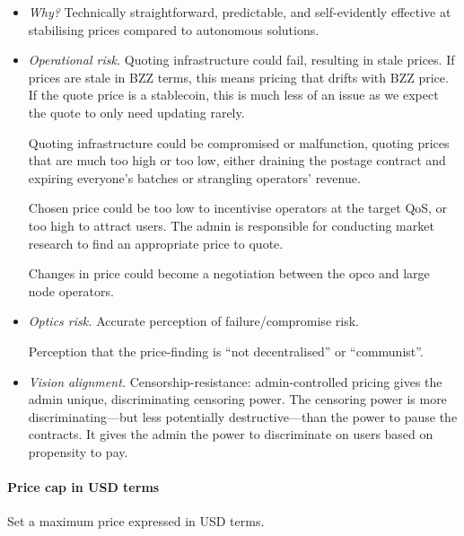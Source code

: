 \begin{itemize}
  \item \emph{Why?} Technically straightforward, predictable, and self-evidently effective at stabilising prices compared to autonomous solutions.

  \item \emph{Operational risk.} Quoting infrastructure could fail, resulting in stale prices. If prices are stale in BZZ terms, this means pricing that drifts with BZZ price. If the quote price is a stablecoin, this is much less of an issue as we expect the quote to only need updating rarely.

  Quoting infrastructure could be compromised or malfunction, quoting prices that are much too high or too low, either draining the postage contract and expiring everyone's batches or strangling operators' revenue.

  Chosen price could be too low to incentivise operators at the target QoS, or too high to attract users. The admin is responsible for conducting market research to find an appropriate price to quote.

  Changes in price could become a negotiation between the opco and large node operators.

  \item \emph{Optics risk.} Accurate perception of failure/compromise risk.

  Perception that the price-finding is ``not decentralised'' or ``communist''.

  \item \emph{Vision alignment.} Censorship-resistance: admin-controlled pricing gives the admin unique, discriminating censoring power. The censoring power is more discriminating---but less potentially destructive---than the power to pause the contracts. It gives the admin the power to discriminate on users based on propensity to pay.
\end{itemize}

\paragraph{Price cap in USD terms}

Set a maximum price expressed in USD terms.

